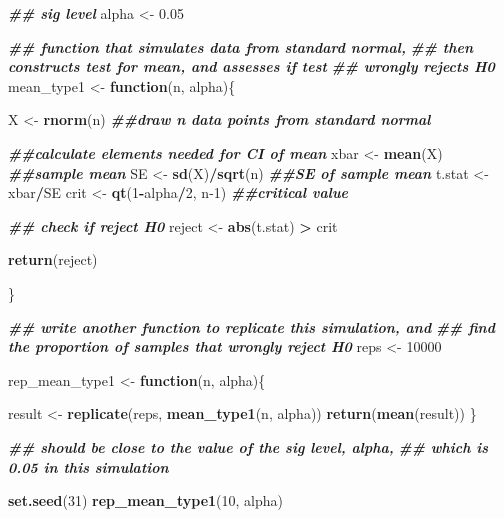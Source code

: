 \documentclass[
]{book}
\newenvironment{Shaded}{\begin{snugshade}}{\end{snugshade}}
\newcommand{\ControlFlowTok}[1]{\textcolor[rgb]{0.13,0.29,0.53}{\textbf{#1}}}
\newcommand{\DecValTok}[1]{\textcolor[rgb]{0.00,0.00,0.81}{#1}}
\newcommand{\DocumentationTok}[1]{\textcolor[rgb]{0.56,0.35,0.01}{\textbf{\textit{#1}}}}
\newcommand{\FloatTok}[1]{\textcolor[rgb]{0.00,0.00,0.81}{#1}}
\newcommand{\FunctionTok}[1]{\textcolor[rgb]{0.13,0.29,0.53}{\textbf{#1}}}
\newcommand{\NormalTok}[1]{#1}
\newcommand{\OtherTok}[1]{\textcolor[rgb]{0.56,0.35,0.01}{#1}}
\newcommand{\SpecialCharTok}[1]{\textcolor[rgb]{0.81,0.36,0.00}{\textbf{#1}}}
\theoremstyle{definition}
\theoremstyle{definition}
\theoremstyle{definition}
\theoremstyle{definition}
\theoremstyle{remark}
\begin{document}
\begin{Shaded}
\begin{Highlighting}[]
\DocumentationTok{\#\# sig level}
\NormalTok{alpha }\OtherTok{\textless{}{-}} \FloatTok{0.05}

\DocumentationTok{\#\# function that simulates data from standard normal,}
\DocumentationTok{\#\# then constructs test for mean, and assesses if test}
\DocumentationTok{\#\# wrongly rejects H0}
\NormalTok{mean\_type1 }\OtherTok{\textless{}{-}} \ControlFlowTok{function}\NormalTok{(n, alpha)\{}
  
\NormalTok{  X }\OtherTok{\textless{}{-}} \FunctionTok{rnorm}\NormalTok{(n) }\DocumentationTok{\#\#draw n data points from standard normal}
  
  \DocumentationTok{\#\#calculate elements needed for CI of mean}
\NormalTok{  xbar }\OtherTok{\textless{}{-}} \FunctionTok{mean}\NormalTok{(X) }\DocumentationTok{\#\#sample mean}
\NormalTok{  SE }\OtherTok{\textless{}{-}} \FunctionTok{sd}\NormalTok{(X)}\SpecialCharTok{/}\FunctionTok{sqrt}\NormalTok{(n) }\DocumentationTok{\#\#SE of sample mean}
\NormalTok{  t.stat }\OtherTok{\textless{}{-}}\NormalTok{ xbar}\SpecialCharTok{/}\NormalTok{SE}
\NormalTok{  crit }\OtherTok{\textless{}{-}} \FunctionTok{qt}\NormalTok{(}\DecValTok{1}\SpecialCharTok{{-}}\NormalTok{alpha}\SpecialCharTok{/}\DecValTok{2}\NormalTok{, n}\DecValTok{{-}1}\NormalTok{) }\DocumentationTok{\#\#critical value}
  
  \DocumentationTok{\#\# check if reject H0}
\NormalTok{  reject }\OtherTok{\textless{}{-}} \FunctionTok{abs}\NormalTok{(t.stat) }\SpecialCharTok{\textgreater{}}\NormalTok{ crit}
 
  \FunctionTok{return}\NormalTok{(reject)}
  
\NormalTok{\}}

\DocumentationTok{\#\# write another function to replicate this simulation, and}
\DocumentationTok{\#\# find the proportion of samples that wrongly reject H0}
\NormalTok{reps }\OtherTok{\textless{}{-}} \DecValTok{10000}

\NormalTok{rep\_mean\_type1 }\OtherTok{\textless{}{-}} \ControlFlowTok{function}\NormalTok{(n, alpha)\{}
  
\NormalTok{  result }\OtherTok{\textless{}{-}} \FunctionTok{replicate}\NormalTok{(reps, }\FunctionTok{mean\_type1}\NormalTok{(n, alpha))}
  \FunctionTok{return}\NormalTok{(}\FunctionTok{mean}\NormalTok{(result))}
\NormalTok{\}}

\DocumentationTok{\#\# should be close to the value of the sig level, alpha, }
\DocumentationTok{\#\# which is 0.05 in this simulation}

\FunctionTok{set.seed}\NormalTok{(}\DecValTok{31}\NormalTok{)}
\FunctionTok{rep\_mean\_type1}\NormalTok{(}\DecValTok{10}\NormalTok{, alpha)}
\end{Highlighting}
\end{Shaded}
\end{document}
